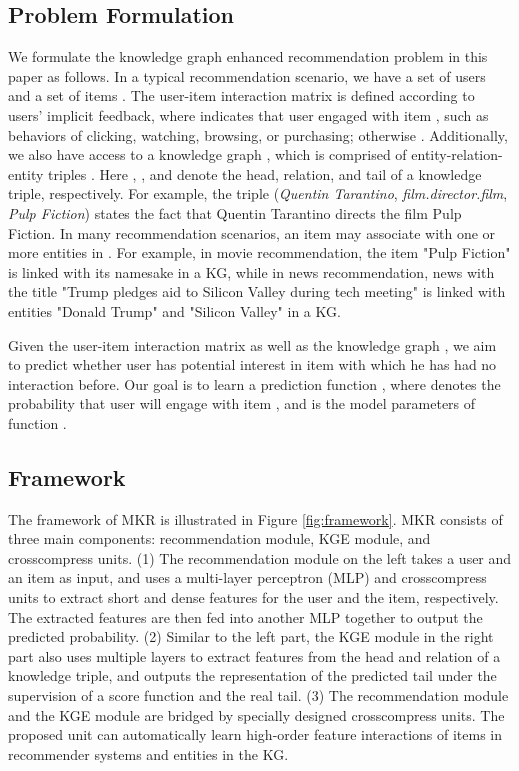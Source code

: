 \documentclass[sigconf]{acmart}
\begin{document}
   \subsection{Problem Formulation}
		We formulate the knowledge graph enhanced recommendation problem in this paper as follows.
		In a typical recommendation scenario, we have a set of  users  and a set of  items .
		The user-item interaction matrix  is defined according to users' implicit feedback, where  indicates that user  engaged with item , such as behaviors of clicking, watching, browsing, or purchasing; otherwise .
		Additionally, we also have access to a knowledge graph , which is comprised of entity-relation-entity triples .
		Here , , and  denote the head, relation, and tail of a knowledge triple, respectively.
		For example, the triple (\textit{Quentin Tarantino}, \textit{film.director.film}, \textit{Pulp Fiction}) states the fact that Quentin Tarantino directs the film Pulp Fiction.
		In many recommendation scenarios, an item  may associate with one or more entities in .
		For example, in movie recommendation, the item "Pulp Fiction" is linked with its namesake in a KG, while in news recommendation, news with the title "Trump pledges aid to Silicon Valley during tech meeting" is linked with entities "Donald Trump" and "Silicon Valley" in a KG.
		
		Given the user-item interaction matrix  as well as the knowledge graph , we aim to predict whether user  has potential interest in item  with which he has had no interaction before.
		Our goal is to learn a prediction function , where  denotes the probability that user  will engage with item , and  is the model parameters of function .
	
	
	\subsection{Framework}		
		The framework of MKR is illustrated in Figure \ref{fig:framework}.
		MKR consists of three main components: recommendation module, KGE module, and crosscompress units.
		(1) The recommendation module on the left takes a user and an item as input, and uses a multi-layer perceptron (MLP) and crosscompress units to extract short and dense features for the user and the item, respectively.
		The extracted features are then fed into another MLP together to output the predicted probability.
		(2) Similar to the left part, the KGE module in the right part also uses multiple layers to extract features from the head and relation of a knowledge triple, and outputs the representation of the predicted tail under the supervision of a score function  and the real tail.
		(3) The recommendation module and the KGE module are bridged by specially designed crosscompress units.
		The proposed unit can automatically learn high-order feature interactions of items in recommender systems and entities in the KG.		
		
\end{document}
